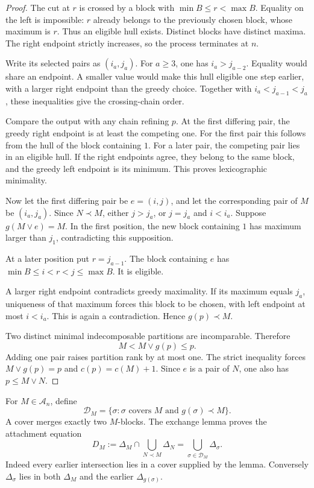 \begin{proof}
The cut at \(r\) is crossed by a
block with \(\min B\leq r<\max B\).
Equality on the left is impossible:
\(r\) already belongs to the previously
chosen block, whose maximum is \(r\).
Thus an eligible hull exists.
Distinct blocks have distinct maxima.
The right endpoint strictly increases,
so the process terminates at \(n\).

Write its selected pairs as \((i_a,j_a)\).
For \(a\geq3\), one has \(i_a>j_{a-2}\).
Equality would share an endpoint.
A smaller value would make this hull
eligible one step earlier, with a larger
right endpoint than the greedy choice.
Together with \(i_a<j_{a-1}<j_a\),
these inequalities give the crossing-chain order.

Compare the output with any chain refining \(p\).
At the first differing pair, the greedy
right endpoint is at least the competing one.
For the first pair this follows from
the hull of the block containing \(1\).
For a later pair, the competing pair
lies in an eligible hull.
If the right endpoints agree, they
belong to the same block, and the
greedy left endpoint is its minimum.
This proves lexicographic minimality.

Now let the first differing pair be
\(e=(i,j)\), and let the corresponding
pair of \(M\) be \((i_a,j_a)\).
Since \(N\prec M\), either \(j>j_a\),
or \(j=j_a\) and \(i<i_a\).
Suppose \(g(M\vee e)=M\).
In the first position, the new block
containing \(1\) has maximum larger than \(j_1\),
contradicting this supposition.

At a later position put \(r=j_{a-1}\).
The block containing \(e\) has
\(\min B\leq i<r<j\leq\max B\).
It is eligible.

A larger right endpoint contradicts greedy
maximality. If its maximum equals \(j_a\),
uniqueness of that maximum forces this block
to be chosen, with left endpoint at most
\(i<i_a\). This is again a contradiction.
Hence \(g(p)\prec M\).

Two distinct minimal indecomposable partitions
are incomparable. Therefore
\[
                     M<M\vee g(p)\leq p.
\]
Adding one pair raises partition rank
by at most one.
The strict inequality forces
\(M\vee g(p)=p\) and \(c(p)=c(M)+1\).
Since \(e\) is a pair of \(N\),
one also has \(p\leq M\vee N\).
\end{proof}

For \(M\in\mathcal A_n\), define
\[
 \mathscr D_M=\{\sigma:\sigma\text{ covers }M
                              \text{ and }g(\sigma)\prec M\}.
\]
A cover merges exactly two \(M\)-blocks.
The exchange lemma proves the attachment equation
\begin{equation}\label{v4-eq:singular-vacuum-attachment}
 D_M:=\Delta_M\cap\bigcup_{N\prec M}\Delta_N
                         =\bigcup_{\sigma\in\mathscr D_M}\Delta_\sigma.
\end{equation}
Indeed every earlier intersection lies
in a cover supplied by the lemma.
Conversely \(\Delta_\sigma\) lies in both
\(\Delta_M\) and the earlier \(\Delta_{g(\sigma)}\).

